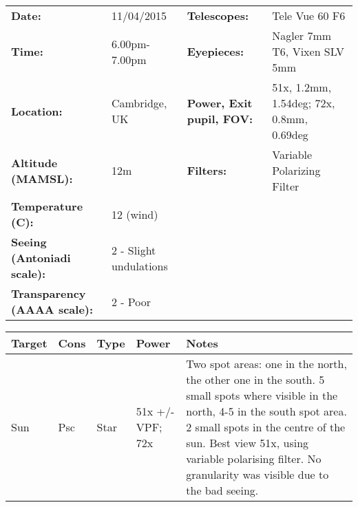 \begin{tabular}{ p{1.7in} p{1.2in} p{1.5in} p{4.2in}}
{\bf Date:} & 11/04/2015 & {\bf Telescopes:} & Tele Vue 60 F6 \\ 
{\bf Time:} & 6.00pm-7.00pm & {\bf Eyepieces:} & Nagler 7mm T6, Vixen SLV 5mm \\ 
{\bf Location:} & Cambridge, UK & {\bf Power, Exit pupil, FOV:} & 51x, 1.2mm, 1.54deg; 72x, 0.8mm, 0.69deg \\ 
{\bf Altitude (MAMSL):} & 12m & {\bf Filters:} & Variable Polarizing Filter \\ 
{\bf Temperature (C):} & 12 (wind) & & \\ 
{\bf Seeing (Antoniadi scale):} & 2 - Slight undulations & & \\ 
{\bf Transparency (AAAA scale):} & 2 - Poor & & \\ 
\end{tabular}
\centering 
\begin{longtable}{ p{0.8in}  p{0.3in}  p{0.5in}  p{0.9in}  p{5.8in} }
\hline 
{\bf Target} & {\bf Cons} & {\bf Type} & {\bf Power} & {\bf Notes} \\ 
\hline 
Sun & Psc & Star & 51x +/- VPF; 72x & Two spot areas: one in the north, the other one in the south. 5 small spots where visible in the north, 4-5 in the south spot area. 2 small spots in the centre of the sun. Best view 51x, using variable polarising filter. No granularity was visible due to the bad seeing. \\ 
\hline 
\end{longtable} 
